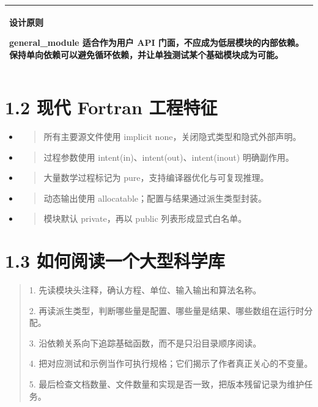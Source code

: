 \documentclass[UTF8,openany,11pt,fontset=fandol]{ctexbook}
\begin{document}
\begin{longtable}[]{@{}l@{}}
\toprule
\endhead
\begin{minipage}[t]{0.97\columnwidth}\raggedright
\textbf{设计原则}

general\_module 适合作为用户 API
门面，不应成为低层模块的内部依赖。保持单向依赖可以避免循环依赖，并让单独测试某个基础模块成为可能。\strut
\end{minipage}\tabularnewline
\bottomrule
\end{longtable}

\section{\texorpdfstring{\textbf{1.2 现代 Fortran
工程特征}}{1.2 现代 Fortran 工程特征}}\label{ux73b0ux4ee3-fortran-ux5de5ux7a0bux7279ux5f81}

\begin{itemize}
\item
  \begin{quote}
  所有主要源文件使用 implicit none，关闭隐式类型和隐式外部声明。
  \end{quote}
\item
  \begin{quote}
  过程参数使用 intent(in)、intent(out)、intent(inout) 明确副作用。
  \end{quote}
\item
  \begin{quote}
  大量数学过程标记为 pure，支持编译器优化与可复现推理。
  \end{quote}
\item
  \begin{quote}
  动态输出使用 allocatable；配置与结果通过派生类型封装。
  \end{quote}
\item
  \begin{quote}
  模块默认 private，再以 public 列表形成显式白名单。
  \end{quote}
\end{itemize}

\section{\texorpdfstring{\textbf{1.3
如何阅读一个大型科学库}}{1.3 如何阅读一个大型科学库}}\label{ux5982ux4f55ux9605ux8bfbux4e00ux4e2aux5927ux578bux79d1ux5b66ux5e93}

\begin{quote}
1. 先读模块头注释，确认方程、单位、输入输出和算法名称。

2. 再读派生类型，判断哪些量是配置、哪些量是结果、哪些数组在运行时分配。

3. 沿依赖关系向下追踪基础函数，而不是只沿目录顺序阅读。

4. 把对应测试和示例当作可执行规格；它们揭示了作者真正关心的不变量。

5. 最后检查文档数量、文件数量和实现是否一致，把版本残留记录为维护任务。
\end{quote}
\end{document}
